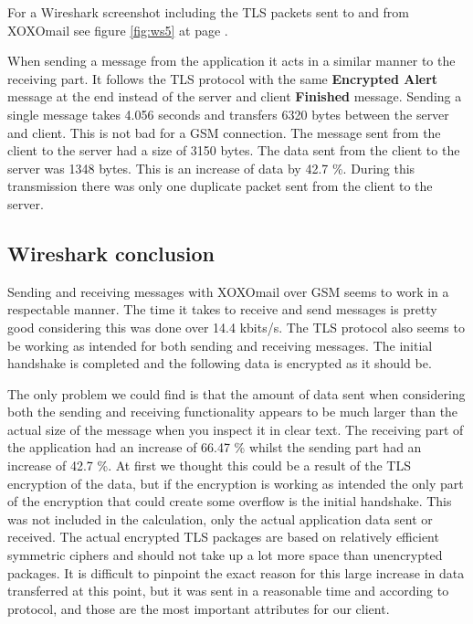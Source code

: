 For a Wireshark screenshot including the TLS packets sent to and from XOXOmail see figure \ref{fig:ws5} at page \pageref{fig:ws5}.
\newline

When sending a message from the application it acts in a similar manner to the receiving part. It follows the TLS protocol with the same \textbf{Encrypted Alert} message at the end instead of the server and client \textbf{Finished} message. 
\newline
\newline
Sending a single message takes 4.056 seconds and transfers 6320 bytes between the server and client. This is not bad for a GSM connection. The message sent from the client to the server had a size of 3150 bytes. The data sent from the client to the server was 1348 bytes.
This is an increase of data by 42.7 \%. During this transmission there was only one duplicate packet sent from the client to the server.

\newpage

\subsection{Wireshark conclusion}
Sending and receiving messages with XOXOmail over GSM seems to work in a respectable manner. The time it takes to receive and send messages is pretty good considering this was done over 14.4 kbits/s. The TLS protocol also seems to be working as intended for both sending and receiving messages. The initial handshake is completed and the following data is encrypted as it should be. 
\newline

The only problem we could find is that the amount of data sent when considering both the sending and receiving functionality appears to be much larger than the actual size of the message when you inspect it in clear text. The receiving part of the application had an increase of 66.47 \% whilst the sending part had an increase of 42.7 \%. 
\newline
\newline
At first we thought this could be a result of the TLS encryption of the data, but if the encryption is working as intended the only part of the encryption that could create some overflow is the initial handshake. This was not included in the calculation, only the actual application data sent or received. The actual encrypted TLS packages are based on relatively efficient symmetric ciphers and should not take up a lot more space than unencrypted packages.  
\newline
\newline
It is difficult to pinpoint the exact reason for this large increase in data transferred at this point, but it was sent in a reasonable time and according to protocol, and those are the most important attributes for our client.  
